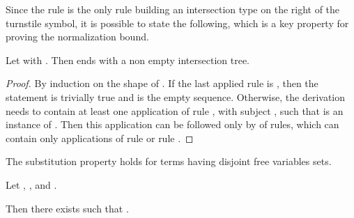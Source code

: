Since the  rule is the only rule building an intersection type on the right of the turnstile symbol, it is possible to state the following, which is a key property for proving the normalization bound.


\begin{property}
\label{prop:stra}
Let  with . Then  ends with a non empty intersection tree. 
\end{property}

\begin{proof}
By induction on the shape of .
If the last applied rule is , then the statement is trivially true and  is the empty sequence.
Otherwise, the derivation needs to contain at least one application of rule , with subject , such that
 is an instance of . Then this application can be followed only by  of rules, which can contain only applications of rule  or rule .
\end{proof}


The substitution property holds for terms having disjoint free variables sets.

\begin{lemma}[Substitution]
\label{lem:subs}
Let , , 
and .

Then there exists  such that .
\end{lemma}

